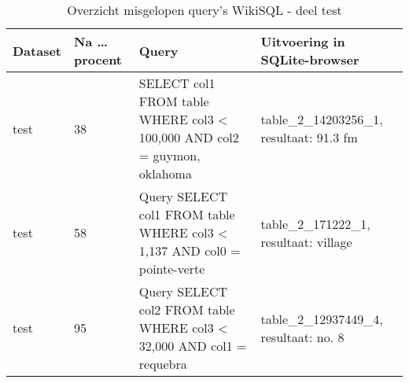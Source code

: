\begin{table}[]
	\centering
	\begin{tabular}{ | l | l | p{5cm} | p{5cm} |}
		\hline
		Dataset & Na \dots procent & Query & Uitvoering in SQLite-browser \\ \hline
		test 	& 38 			   & SELECT col1 FROM table WHERE col3 < 100,000 AND col2 = guymon, oklahoma & table\_2\_14203256\_1, resultaat: 91.3 fm  \\ \hline
		test 	& 58 			   & Query SELECT col1 FROM table WHERE col3 < 1,137 AND col0 = pointe-verte & table\_2\_171222\_1, resultaat: village  \\ \hline
		test 	& 95 			   & Query SELECT col2 FROM table WHERE col3 < 32,000 AND col1 = requebra & table\_2\_12937449\_4, resultaat: no. 8  \\ \hline
	\end{tabular}
	\caption{Overzicht misgelopen query's WikiSQL - deel test}
	\label{table:wikisqlerrorstest}
\end{table}
